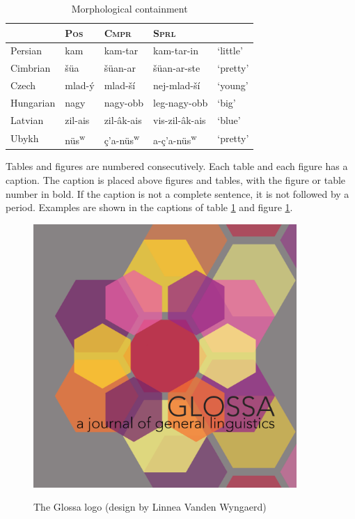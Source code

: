 \documentclass[charis,linguex]{glossa}
\begin{document}
\begin{table}[h]
\caption{Morphological containment}	
\begin{tabular}{lllll}
 & \textsc{Pos} & \textsc{Cmpr} & \textsc{Sprl}\\
\toprule
Persian & kam & kam-tar & kam-tar-in & `little’\\
Cimbrian & šüa & šüan-ar & šüan-ar-ste & `pretty’ \\
Czech & mlad-ý & mlad-ší & nej-mlad-ší & `young’\\
Hungarian & nagy & nagy-obb & leg-nagy-obb & `big’\\
Latvian & zil-ais & zil-âk-ais & vis-zil-âk-ais & `blue’\\
Ubykh &  nüs\textsuperscript{w}\textipa{@} & ç’a-nüs\textsuperscript{w}\textipa{@} & a-ç’a-nüs\textsuperscript{w}\textipa{@} & `pretty’ \\
\bottomrule
\end{tabular}\label{tbl:table1}
\end{table}

Tables and figures are numbered consecutively. Each table and each figure has a caption. The caption is placed above figures and tables, with the figure or table number in bold.  If the caption is not a complete sentence, it is not followed by a period. Examples are shown in the captions of table \ref{tbl:table1} and figure \ref{fig:glossalogo}. 

\begin{figure}[h]
\caption{The Glossa logo (design by Linnea Vanden Wyngaerd)}
\includegraphics[width=10cm]{glossa}
\label{fig:glossalogo}
\end{figure}
\end{document}
